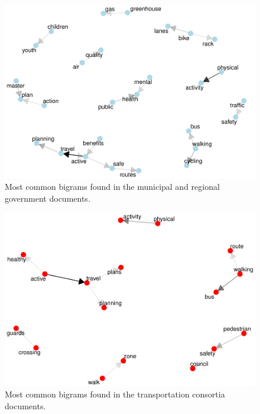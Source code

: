\documentclass[]{elsarticle} %
\begin{document}
\begin{figure}

{\centering \includegraphics[width=1\linewidth]{AST-Framing-Ontario_files/figure-latex/city-visual-1} 

}

\caption{\label{fig:city-visual}Most common bigrams found in the municipal and regional government documents.}\label{fig:city-visual}
\end{figure}

\begin{figure}

{\centering \includegraphics[width=1\linewidth]{AST-Framing-Ontario_files/figure-latex/consortia-visual-1} 

}

\caption{\label{fig:consortia-visual}Most common bigrams found in the transportation consortia documents.}\label{fig:consortia-visual}
\end{figure}
\end{document}
